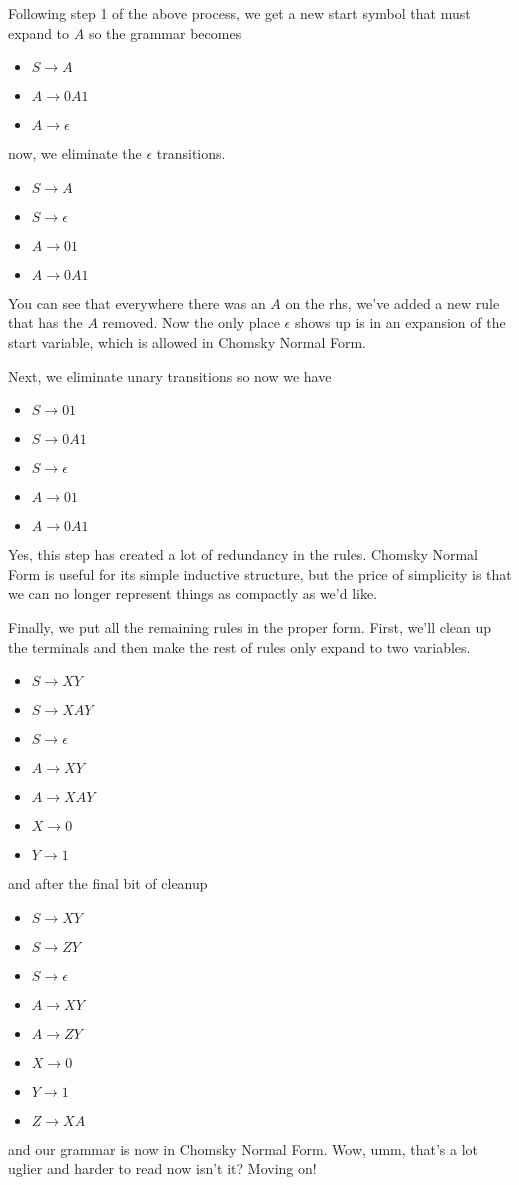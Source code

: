 \documentclass[11pt]{article}
\begin{document}
Following step 1 of the above process, we get a new start symbol that must expand to $A$ so the grammar becomes
\begin{itemize}
\item $S \to A$
\item $A \to 0A1$
\item $A \to \epsilon$
\end{itemize}

now, we eliminate the $\epsilon$ transitions.
\begin{itemize}
\item $S \to A$
\item $S \to \epsilon$
\item $A \to 01$
\item $A \to 0A1$
\end{itemize}
You can see that everywhere there was an $A$ on the rhs, we've added a new rule that has the $A$ removed. Now the only place $\epsilon$ shows up is in an expansion of the start variable, which is allowed in Chomsky Normal Form.

Next, we eliminate unary transitions so now we have
\begin{itemize}
\item $S \to 01$
\item $S \to 0A1$
\item $S \to \epsilon$
\item $A \to 01$
\item $A \to 0A1$
\end{itemize}
Yes, this step has created a lot of redundancy in the rules. Chomsky Normal Form is useful for its simple inductive structure, but the price of simplicity is that we can no longer represent things as compactly as we'd like.

Finally, we put all the remaining rules in the proper form. First, we'll clean up the terminals and then make the rest of rules only expand to two variables.
\begin{itemize}
\item $S \to XY$
\item $S \to XAY$
\item $S \to \epsilon$
\item $A \to XY$
\item $A \to XAY$
\item $X \to 0$
\item $Y \to 1$
\end{itemize}
and after the final bit of cleanup
\begin{itemize}
\item $S \to XY$
\item $S \to ZY$
\item $S \to \epsilon$
\item $A \to XY$
\item $A \to ZY$
\item $X \to 0$
\item $Y \to 1$
\item $Z \to XA$
\end{itemize}
and our grammar is now in Chomsky Normal Form. Wow, umm, that's a lot uglier and harder to read now isn't it? Moving on!
\end{document}
